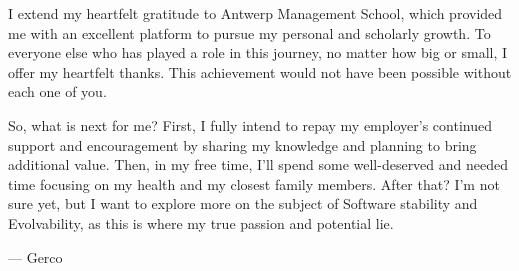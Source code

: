 I extend my heartfelt gratitude to Antwerp Management School, which provided me with an
excellent platform to pursue my personal and scholarly growth. To everyone else who has
played a role in this journey, no matter how big or small, I offer my heartfelt thanks.
This achievement would not have been possible without each one of you.

So, what is next for me? First, I fully intend to repay my employer's continued support
and encouragement by sharing my knowledge and planning to bring additional value. Then, in
my free time, I'll spend some well-deserved and needed time focusing on my health and my
closest family members. After that? I'm not sure yet, but I want to explore more on the
subject of Software stability and Evolvability, as this is where my true passion and
potential lie. 

\noindent --- Gerco